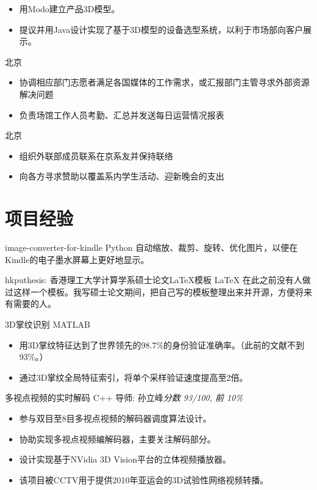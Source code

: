 \documentclass[10pt,a4paper]{moderncv/moderncv}
\begin{document}
{
\begin{itemize}
	\item 用Modo建立产品3D模型。
	\item 提议并用Java设计实现了基于3D模型的设备选型系统，以利于市场部向客户展示。
\end{itemize}
}

{北京}{}
{
\begin{itemize}
	\item 协调相应部门志愿者满足各国媒体的工作需求，或汇报部门主管寻求外部资源解决问题
	\item 负责场馆工作人员考勤、汇总并发送每日运营情况报表
\end{itemize}
}

{北京}{}
{
\begin{itemize}
	\item 组织外联部成员联系在京系友并保持联络
	\item 向各方寻求赞助以覆盖系内学生活动、迎新晚会的支出
\end{itemize}
}

\section{项目经验}
{image-converter-for-kindle}
{Python}
{}{}
{
自动缩放、裁剪、旋转、优化图片，以便在Kindle的电子墨水屏幕上更好地显示。
}


{hkputhesis: 香港理工大学计算学系硕士论文\LaTeX 模板}
{LaTeX}
{}{}
{
在此之前没有人做过这样一个模板。我写硕士论文期间，把自己写的模板整理出来并开源，方便将来有需要的人。
}

{3D掌纹识别}
{MATLAB}
{}{}
{
\begin{itemize}
	\item 用3D掌纹特征达到了世界领先的98.7\%的身份验证准确率。（此前的文献不到93\%。）
	\item 通过3D掌纹全局特征索引，将单个采样验证速度提高至2倍。
\end{itemize}
}

{多视点视频的实时解码}
{C++}
{导师: 孙立峰}{\textit{分数 93/100, 前 10\%}}
{
\begin{itemize}
	\item 参与双目至8目多视点视频的解码器调度算法设计。
	\item 协助实现多视点视频编解码器，主要关注解码部分。
	\item 设计实现基于NVidia 3D Vision平台的立体视频播放器。
	\item 该项目被CCTV用于提供2010年亚运会的3D试验性网络视频转播。
\end{itemize}
}
\end{document}
